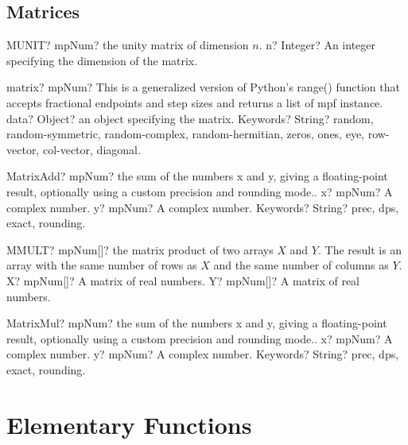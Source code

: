 \documentclass[12pt,a4paper,openany]{book}
\begin{document}
\section{Matrices}

\begin{mpFunctionsExtract}
\mpWorksheetFunctionOneNotImplemented
{MUNIT? mpNum? the unity matrix of dimension $n$.}
{n? Integer? An integer specifying the dimension of the matrix.}
\end{mpFunctionsExtract}

\begin{mpFunctionsExtract}
\mpFunctionTwo
{matrix? mpNum?  This is a generalized version of Python's range() function that accepts fractional endpoints and step sizes and returns a list of mpf instance.}
{data? Object? an object specifying the matrix.}
{Keywords? String? random, random-symmetric, random-complex, random-hermitian, zeros, ones, eye, row-vector, col-vector, diagonal.}
\end{mpFunctionsExtract}

\begin{mpFunctionsExtract}
\mpFunctionThree
{MatrixAdd? mpNum? the sum of the numbers x and y, giving a floating-point result, optionally using a custom precision and rounding mode..}
{x? mpNum? A complex number.}
{y? mpNum? A complex number.}
{Keywords? String? prec, dps, exact, rounding.}
\end{mpFunctionsExtract}

\begin{mpFunctionsExtract}
\mpWorksheetFunctionTwoNotImplemented
{MMULT? mpNum[]? the matrix product of two arrays $X$ and $Y$. The result is an array with the same number of rows as $X$ and the same number of columns as $Y$.}
{X? mpNum[]? A matrix of real numbers.}
{Y? mpNum[]? A matrix of real numbers.}
\end{mpFunctionsExtract}

\begin{mpFunctionsExtract}
\mpFunctionThree
{MatrixMul? mpNum? the sum of the numbers x and y, giving a floating-point result, optionally using a custom precision and rounding mode..}
{x? mpNum? A complex number.}
{y? mpNum? A complex number.}
{Keywords? String? prec, dps, exact, rounding.}
\end{mpFunctionsExtract}

\chapter{Elementary Functions}
\end{document}
